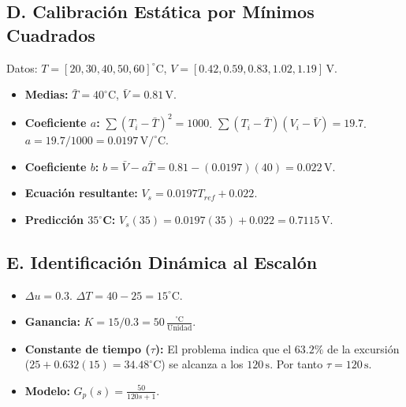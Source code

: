 \documentclass[11pt, a4paper]{article}
\begin{document}
\subsection*{D. Calibración Estática por Mínimos Cuadrados}
Datos: $T = [20, 30, 40, 50, 60]^\circ\text{C}$, $V = [0.42, 0.59, 0.83, 1.02, 1.19]\,\text{V}$.
\begin{itemize}
    \item \textbf{Medias:} $\bar{T} = 40^\circ\text{C}$, $\bar{V} = 0.81\,\text{V}$.
    \item \textbf{Coeficiente $a$:} $\sum(T_i - \bar{T})^2 = 1000$. $\sum(T_i - \bar{T})(V_i - \bar{V}) = 19.7$. \\
    $a = 19.7 / 1000 = 0.0197\,\text{V}/^\circ\text{C}$.
    \item \textbf{Coeficiente $b$:} $b = \bar{V} - a\bar{T} = 0.81 - (0.0197)(40) = 0.022\,\text{V}$.
    \item \textbf{Ecuación resultante:} $V_s = 0.0197 T_{ref} + 0.022$.
    \item \textbf{Predicción $35^\circ$C:} $V_s(35) = 0.0197(35) + 0.022 = 0.7115\,\text{V}$.
\end{itemize}

\subsection*{E. Identificación Dinámica al Escalón}
\begin{itemize}
    \item $\Delta u = 0.3$. $\Delta T = 40 - 25 = 15^\circ\text{C}$.
    \item \textbf{Ganancia:} $K = 15 / 0.3 = 50\,\frac{^\circ\text{C}}{\text{Unidad}}$.
    \item \textbf{Constante de tiempo ($\tau$):} El problema indica que el $63.2\%$ de la excursión ($25 + 0.632(15) = 34.48^\circ\text{C}$) se alcanza a los $120\,\text{s}$. Por tanto $\tau = 120\,\text{s}$.
    \item \textbf{Modelo:} $G_p(s) = \frac{50}{120s + 1}$.
\end{itemize}
\end{document}
